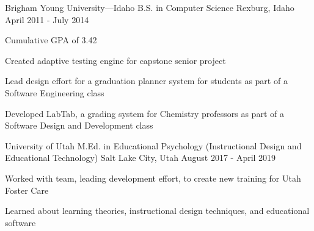\begin{cventries}
  \cventry
    {Brigham Young University---Idaho}
    {B.S. in Computer Science}
    {Rexburg, Idaho}
    {April 2011 - July 2014}
    {
      \begin{cvitems}
        \item {Cumulative GPA of 3.42}
        \item {Created adaptive testing engine for capstone senior project}
        \item {Lead design effort for a graduation planner system for students as part of a Software Engineering class}
        \item {Developed LabTab, a grading system for Chemistry professors as part of a Software Design and Development class}
      \end{cvitems}
    }
  \cventry
    {University of Utah}
    {M.Ed. in Educational Psychology (Instructional Design and Educational Technology)}
    {Salt Lake City, Utah}
    {August 2017 - April 2019}
    {
      \begin{cvitems}
        \item {Worked with team, leading development effort, to create new training for Utah Foster Care}
        \item {Learned about learning theories, instructional design techniques, and educational software}
      \end{cvitems}
    }
\end{cventries}
